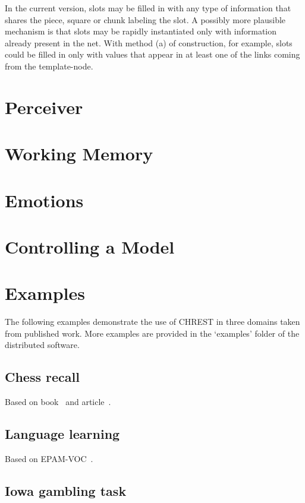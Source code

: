 \documentclass{article}
\begin{document}
In the current version, slots may be filled in with any type of information
that shares the piece, square or chunk labeling the slot. A possibly more
plausible mechanism is that slots may be rapidly instantiated only with
information already present in the net.  With method (a) of construction, for
example, slots could be filled in only with values that appear in at least one
of the links coming from the template-node.


\section{Perceiver}

\section{Working Memory}

\section{Emotions}

\section{Controlling a Model}

\section{Examples}

The following examples demonstrate the use of CHREST in three domains taken
from published work.  More examples are provided in the `examples' folder of
the distributed software.

\subsection{Chess recall}

Based on book~\cite{deGroot96} and article~\cite{Gobet00b}.

\subsection{Language learning}

Based on EPAM-VOC~\cite{Jones08}.

\subsection{Iowa gambling task}
\end{document}
